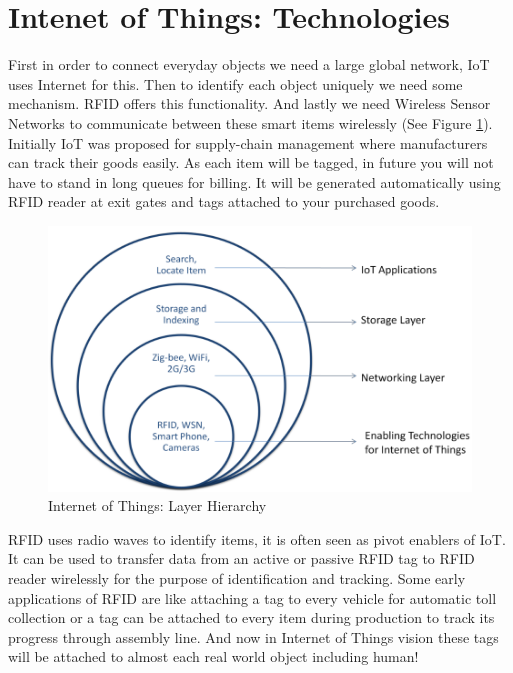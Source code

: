 \documentclass [a4paper,12pt]{book}
\begin{document}
\section{Intenet of Things: Technologies}
First in order to connect everyday objects we need a large global network, IoT uses Internet for this. Then to identify each object uniquely we need some mechanism. RFID offers this functionality. And lastly we need Wireless Sensor Networks to communicate between these smart items wirelessly (See Figure \ref{IoT:arch}). Initially IoT was proposed for supply-chain management where manufacturers can track their goods easily. As each item will be tagged, in future you will not have to stand in long queues for billing. It will be generated automatically using RFID reader at exit gates and tags attached to your purchased goods. 

\vspace{0.5cm}
\begin{figure}[h]
\begin{center}
\includegraphics[scale=0.35]{images/7.png}
\caption{Internet of Things: Layer Hierarchy}
\label{IoT:arch}
\end{center}
\end{figure}

RFID uses radio waves to identify items, it is often seen as pivot enablers of IoT. It can be used to transfer data from an active or passive RFID tag to RFID reader wirelessly for the purpose of identification and tracking. Some early applications of RFID are like attaching a tag to every vehicle for automatic toll collection or a tag can be attached to every item during production to track its progress through assembly line. And now in Internet of Things vision these tags will be attached to almost each real world object including human!
\end{document}
